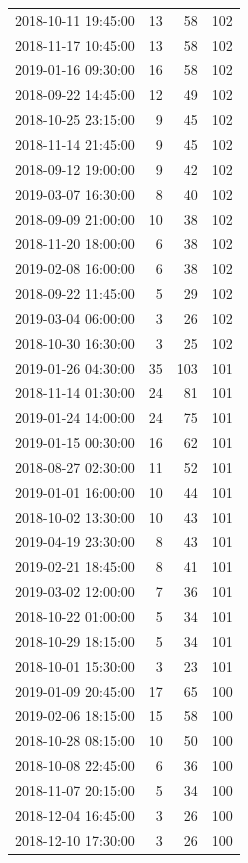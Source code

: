 \begin{tabular}{lrrr}
2018-10-11 19:45:00 & 13 & 58 & 102 \\
2018-11-17 10:45:00 & 13 & 58 & 102 \\
2019-01-16 09:30:00 & 16 & 58 & 102 \\
2018-09-22 14:45:00 & 12 & 49 & 102 \\
2018-10-25 23:15:00 & 9 & 45 & 102 \\
2018-11-14 21:45:00 & 9 & 45 & 102 \\
2018-09-12 19:00:00 & 9 & 42 & 102 \\
2019-03-07 16:30:00 & 8 & 40 & 102 \\
2018-09-09 21:00:00 & 10 & 38 & 102 \\
2018-11-20 18:00:00 & 6 & 38 & 102 \\
2019-02-08 16:00:00 & 6 & 38 & 102 \\
2018-09-22 11:45:00 & 5 & 29 & 102 \\
2019-03-04 06:00:00 & 3 & 26 & 102 \\
2018-10-30 16:30:00 & 3 & 25 & 102 \\
2019-01-26 04:30:00 & 35 & 103 & 101 \\
2018-11-14 01:30:00 & 24 & 81 & 101 \\
2019-01-24 14:00:00 & 24 & 75 & 101 \\
2019-01-15 00:30:00 & 16 & 62 & 101 \\
2018-08-27 02:30:00 & 11 & 52 & 101 \\
2019-01-01 16:00:00 & 10 & 44 & 101 \\
2018-10-02 13:30:00 & 10 & 43 & 101 \\
2019-04-19 23:30:00 & 8 & 43 & 101 \\
2019-02-21 18:45:00 & 8 & 41 & 101 \\
2019-03-02 12:00:00 & 7 & 36 & 101 \\
2018-10-22 01:00:00 & 5 & 34 & 101 \\
2018-10-29 18:15:00 & 5 & 34 & 101 \\
2018-10-01 15:30:00 & 3 & 23 & 101 \\
2019-01-09 20:45:00 & 17 & 65 & 100 \\
2019-02-06 18:15:00 & 15 & 58 & 100 \\
2018-10-28 08:15:00 & 10 & 50 & 100 \\
2018-10-08 22:45:00 & 6 & 36 & 100 \\
2018-11-07 20:15:00 & 5 & 34 & 100 \\
2018-12-04 16:45:00 & 3 & 26 & 100 \\
2018-12-10 17:30:00 & 3 & 26 & 100 \\

\end{tabular}
